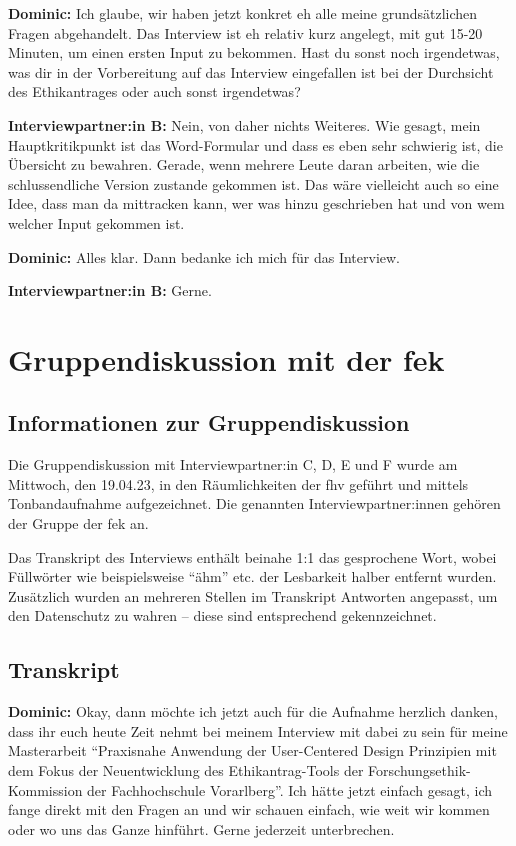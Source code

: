 \documentclass[a4paper,12pt,twoside]{scrreprt}
\begin{document}
\textbf{Dominic:} Ich glaube, wir haben jetzt konkret eh alle meine grundsätzlichen Fragen abgehandelt. Das Interview ist eh relativ kurz angelegt, mit gut 15-20 Minuten, um einen ersten Input zu bekommen. Hast du sonst noch irgendetwas, was dir in der Vorbereitung auf das Interview eingefallen ist bei der Durchsicht des Ethikantrages oder auch sonst irgendetwas?

\textbf{Interviewpartner:in B:} Nein, von daher nichts Weiteres. Wie gesagt, mein Hauptkritikpunkt ist das Word-Formular und dass es eben sehr schwierig ist, die Übersicht zu bewahren. Gerade, wenn mehrere Leute daran arbeiten, wie die schlussendliche Version zustande gekommen ist. Das wäre vielleicht auch so eine Idee, dass man da mittracken kann, wer was hinzu geschrieben hat und von wem welcher Input gekommen ist.

\textbf{Dominic:} Alles klar. Dann bedanke ich mich für das Interview.

\textbf{Interviewpartner:in B:} Gerne.

\cleardoublepage
\chapter{Gruppendiskussion mit der \acl{fek}}
\label{appendix:gruppendiskussion}

\section{Informationen zur Gruppendiskussion}
\label{appendix:gruppendiskussion-infos}

Die Gruppendiskussion mit Interviewpartner:in C, D, E und F wurde am Mittwoch, den 19.04.23, in den Räumlichkeiten der \ac{fhv} geführt und mittels Tonbandaufnahme aufgezeichnet. Die genannten Interviewpartner:innen gehören der Gruppe der \acl{fek} an.

Das Transkript des Interviews enthält beinahe 1:1 das gesprochene Wort, wobei Füllwörter wie beispielsweise \enquote{ähm} etc. der Lesbarkeit halber entfernt wurden. Zusätzlich wurden an mehreren Stellen im Transkript Antworten angepasst, um den Datenschutz zu wahren -- diese sind entsprechend gekennzeichnet.

\section{Transkript}
\label{appendix:gruppendiskussion-transkript}

\textbf{Dominic:} Okay, dann möchte ich jetzt auch für die Aufnahme herzlich danken, dass ihr euch heute Zeit nehmt bei meinem Interview mit dabei zu sein für meine Masterarbeit \enquote{Praxisnahe Anwendung der User-Centered Design Prinzipien mit dem Fokus der Neuentwicklung des Ethikantrag-Tools der Forschungsethik-Kommission der Fachhochschule Vorarlberg}. Ich hätte jetzt einfach gesagt, ich fange direkt mit den Fragen an und wir schauen einfach, wie weit wir kommen oder wo uns das Ganze hinführt. Gerne jederzeit unterbrechen.
\end{document}

